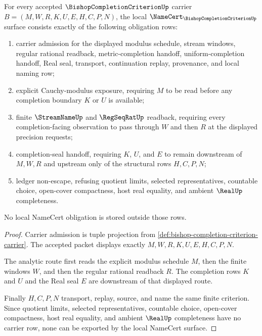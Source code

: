 \begin{theorem}
\label{thm:bishop-completion-criterion-namecert-obligations}
For every accepted $\BishopCompletionCriterionUp$ carrier $B=(M,W,R,K,U,E,H,C,P,N)$, the local $\NameCert_{\BishopCompletionCriterionUp}$ surface consists exactly of the following obligation rows:
\begin{enumerate}
\item carrier admission for the displayed modulus schedule, stream windows, regular rational readback, metric-completion handoff, uniform-completion handoff, Real seal, transport, continuation replay, provenance, and local naming row;
\item explicit Cauchy-modulus exposure, requiring $M$ to be read before any completion boundary $K$ or $U$ is available;
\item finite $\StreamNameUp$ and $\RegSeqRatUp$ readback, requiring every completion-facing observation to pass through $W$ and then $R$ at the displayed precision requests;
\item completion-seal handoff, requiring $K$, $U$, and $E$ to remain downstream of $M,W,R$ and upstream only of the structural rows $H,C,P,N$;
\item ledger non-escape, refusing quotient limits, selected representatives, countable choice, open-cover compactness, host real equality, and ambient $\RealUp$ completeness.
\end{enumerate}
No local NameCert obligation is stored outside those rows.
\end{theorem}
\begin{proof}
Carrier admission is tuple projection from \autoref{def:bishop-completion-criterion-carrier}. The accepted packet displays exactly $M,W,R,K,U,E,H,C,P,N$.

The analytic route first reads the explicit modulus schedule $M$, then the finite windows $W$, and then the regular rational readback $R$. The completion rows $K$ and $U$ and the Real seal $E$ are downstream of that displayed route.

Finally $H,C,P,N$ transport, replay, source, and name the same finite criterion. Since quotient limits, selected representatives, countable choice, open-cover compactness, host real equality, and ambient $\RealUp$ completeness have no carrier row, none can be exported by the local NameCert surface.
\end{proof}


